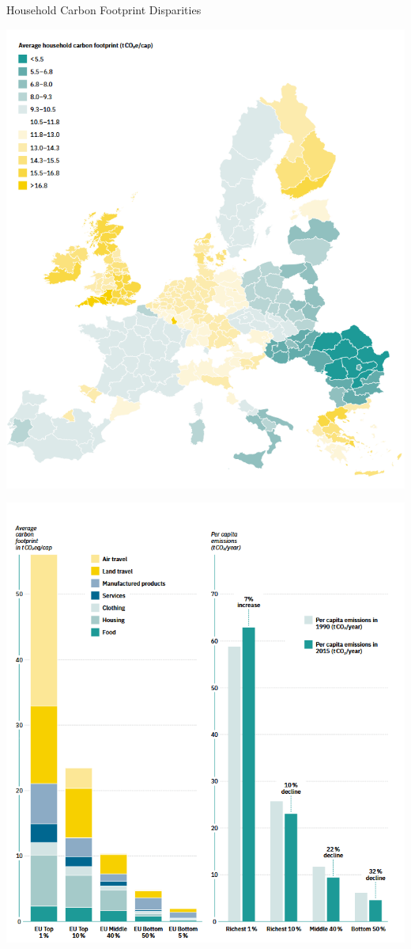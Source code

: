 \documentclass{beamer}
\begin{document}
\begin{frame}{Household Carbon Footprint Disparities}
  \vspace{-2.0em}
\centering
\pause
\begin{minipage}{0.45\linewidth}
    \includegraphics[width=\linewidth]{per capita world emissions.png}
\end{minipage}
\hfill
\pause
\begin{minipage}{0.45\linewidth}
    \includegraphics[width=\linewidth]{emission by income.png}
\end{minipage}


\end{frame}
\end{document}

